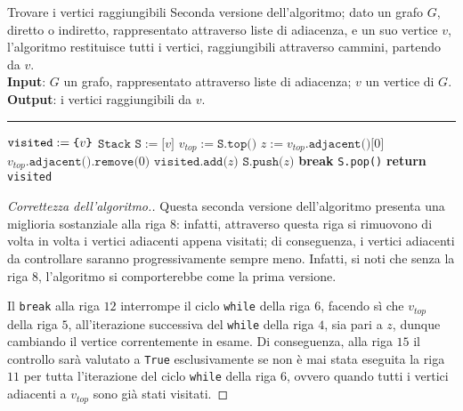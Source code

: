\documentclass[a4paper, 12pt]{report}
\begin{document}
    \begin{framedalgo}[label={findReachableNodes2}]{Trovare i vertici raggiungibili}
        Seconda versione dell'algoritmo; dato un grafo $G$, diretto o indiretto, rappresentato attraverso liste di adiacenza, e un suo vertice $v$, l'algoritmo restituisce tutti i vertici, raggiungibili attraverso cammini, partendo da $v$.\\
        \textbf{Input}: $G$ un grafo, rappresentato attraverso liste di adiacenza; $v$ un vertice di $G$.\\
        \textbf{Output}: i vertici raggiungibili da $v$.

        \hrule
        \begin{algorithmic}[1]
                \State $\texttt{visited} := \verb|{|v\verb|}|$
                \State $\texttt{Stack S} := \texttt{[}v\texttt{]}$
                    \State $v_{top}:=\texttt{S.top()}$
                        \State $z := v_{top}\texttt{.adjacent()[}0\texttt{]}$
                        \State $v_{top}\texttt{.adjacent().remove(}0\texttt{)}$ 
                            \State $\texttt{visited.add(}z\texttt{)}$
                            \State $\texttt{S.push(}z\texttt{)}$
                            \State \textbf{break}
                        \EndIf
                    \EndWhile
                        \State \texttt{S.pop()}
                    \EndIf
                \EndWhile
                \State \textbf{return} \texttt{visited}
            \EndFunction
        \end{algorithmic}
    \end{framedalgo}

    \begin{proof}[Correttezza dell'algoritmo.]
        Questa seconda versione dell'algoritmo presenta una miglioria sostanziale alla riga $8$: infatti, attraverso questa riga si rimuovono di volta in volta i vertici adiacenti appena visitati; di conseguenza, i vertici adiacenti da controllare saranno progressivamente sempre meno. Infatti, si noti che senza la riga $8$, l'algoritmo si comporterebbe come la prima versione.

        Il \texttt{break} alla riga $12$ interrompe il ciclo \texttt{while} della riga $6$, facendo sì che $v_{top}$ della riga $5$, all'iterazione successiva del \texttt{while} della riga $4$, sia pari a $z$, dunque cambiando il vertice correntemente in esame. Di conseguenza, alla riga $15$ il controllo sarà valutato a \texttt{True} esclusivamente se non è mai stata eseguita la riga $11$ per tutta l'iterazione del ciclo \texttt{while} della riga $6$, ovvero quando tutti i vertici adiacenti a $v_{top}$ sono già stati visitati.
    \end{proof}
\end{document}
